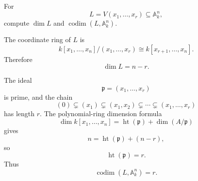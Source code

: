 \begin{problem}\label{prob:vi31-05}
For
\[
L=V(x_1,\ldots,x_r)\subseteq\mathbb A^n_k,
\]
compute \(\dim L\) and \(\operatorname{codim}(L,\mathbb A^n_k)\).
\end{problem}

\ifdefined\FullProblemDossiers
\begin{solution}
The coordinate ring of \(L\) is
\[
k[x_1,\ldots,x_n]/(x_1,\ldots,x_r)
\cong
k[x_{r+1},\ldots,x_n].
\]
Therefore
\[
\boxed{\dim L=n-r}.
\]

The ideal
\[
\mathfrak p=(x_1,\ldots,x_r)
\]
is prime, and the chain
\[
(0)\subsetneq(x_1)\subsetneq(x_1,x_2)\subsetneq\cdots\subsetneq(x_1,\ldots,x_r)
\]
has length \(r\). The polynomial-ring dimension formula
\[
\dim k[x_1,\ldots,x_n]
=
\operatorname{ht}(\mathfrak p)+\dim(A/\mathfrak p)
\]
gives
\[
n=\operatorname{ht}(\mathfrak p)+(n-r),
\]
so
\[
\operatorname{ht}(\mathfrak p)=r.
\]
Thus
\[
\boxed{\operatorname{codim}(L,\mathbb A^n_k)=r}.
\]
\end{solution}
\fi
